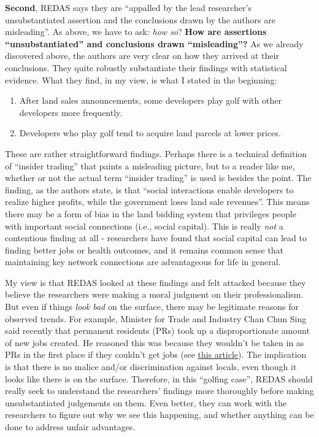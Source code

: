 \documentclass[openany]{book}
\providecommand{\tightlist}{%
  \setlength{\itemsep}{0pt}\setlength{\parskip}{0pt}}
\begin{document}
\textbf{Second}, REDAS says they are ``appalled by the lead researcher's
unsubstantiated assertion and the conclusions drawn by the authors are
misleading''. As above, we have to ask: \emph{how so}? \textbf{How are
assertions ``unsubstantiated'' and conclusions drawn ``misleading''?} As
we already discovered above, the authors are very clear on how they
arrived at their conclusions. They quite robustly substantiate their
findings with statistical evidence. What they find, in my view, is what
I stated in the beginning:

\begin{enumerate}
\def\labelenumi{\arabic{enumi}.}
\tightlist
\item
  After land sales announcements, some developers play golf with other
  developers more frequently.
\item
  Developers who play golf tend to acquire land parcels at lower prices.
\end{enumerate}

These are rather straightforward findings. Perhaps there is a technical
definition of ``insider trading'' that paints a misleading picture, but
to a reader like me, whether or not the actual term ``insider trading''
is used is besides the point. The finding, as the authors state, is that
``social interactions enable developers to realize higher profits, while
the government loses land sale revenues''. This means there may be a
form of bias in the land bidding system that privileges people with
important social connections (i.e., social capital). This is really
\emph{not} a contentious finding at all - researchers have found that
social capital can lead to finding better jobs or health outcomes, and
it remains common sense that maintaining key network connections are
advantageous for life in general.

My view is that REDAS looked at these findings and felt attacked because
they believe the researchers were making a moral judgment on their
professionalism. But even if things \emph{look bad} on the surface,
there may be legitimate reasons for observed trends. For example,
Minister for Trade and Industry Chan Chun Sing said recently that
permanent residents (PRs) took up a disproportionate amount of new jobs
created. He reasoned this was because they wouldn't be taken in as PRs
in the first place if they couldn't get jobs (see
\href{https://www.todayonline.com/singapore/prs-took-about-17-net-new-jobs-created-spore-between-2015-and-2018-chan-chun-sing}{this
article}). The implication is that there is no malice and/or
discrimination against locals, even though it looks like there is on the
surface. Therefore, in this ``golfing case'', REDAS should really seek
to understand the researchers' findings more thoroughly before making
unsubstantiated judgements on them. Even better, they can work with the
researchers to figure out why we see this happening, and whether
anything can be done to address unfair advantages.
\end{document}
